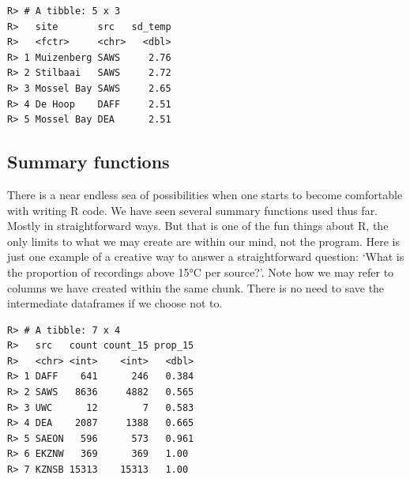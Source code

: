 \documentclass[]{book}
\newenvironment{Shaded}{\begin{snugshade}}{\end{snugshade}}
\newcommand{\KeywordTok}[1]{\textcolor[rgb]{0.13,0.29,0.53}{\textbf{#1}}}
\newcommand{\DataTypeTok}[1]{\textcolor[rgb]{0.13,0.29,0.53}{#1}}
\newcommand{\DecValTok}[1]{\textcolor[rgb]{0.00,0.00,0.81}{#1}}
\newcommand{\StringTok}[1]{\textcolor[rgb]{0.31,0.60,0.02}{#1}}
\newcommand{\OperatorTok}[1]{\textcolor[rgb]{0.81,0.36,0.00}{\textbf{#1}}}
\newcommand{\NormalTok}[1]{#1}
\theoremstyle{definition}
\theoremstyle{definition}
\theoremstyle{definition}
\theoremstyle{remark}
\begin{document}
\begin{verbatim}
R> # A tibble: 5 x 3
R>   site       src   sd_temp
R>   <fctr>     <chr>   <dbl>
R> 1 Muizenberg SAWS     2.76
R> 2 Stilbaai   SAWS     2.72
R> 3 Mossel Bay SAWS     2.65
R> 4 De Hoop    DAFF     2.51
R> 5 Mossel Bay DEA      2.51
\end{verbatim}

\subsection{Summary functions}\label{summary-functions}

There is a near endless sea of possibilities when one starts to become
comfortable with writing R code. We have seen several summary functions
used thus far. Mostly in straightforward ways. But that is one of the
fun things about R, the only limits to what we may create are within our
mind, not the program. Here is just one example of a creative way to
answer a straightforward question: `What is the proportion of recordings
above 15°C per source?'. Note how we may refer to columns we have
created within the same chunk. There is no need to save the intermediate
dataframes if we choose not to.

\begin{Shaded}
\end{Shaded}

\begin{verbatim}
R> # A tibble: 7 x 4
R>   src   count count_15 prop_15
R>   <chr> <int>    <int>   <dbl>
R> 1 DAFF    641      246   0.384
R> 2 SAWS   8636     4882   0.565
R> 3 UWC      12        7   0.583
R> 4 DEA    2087     1388   0.665
R> 5 SAEON   596      573   0.961
R> 6 EKZNW   369      369   1.00 
R> 7 KZNSB 15313    15313   1.00
\end{verbatim}
\end{document}
